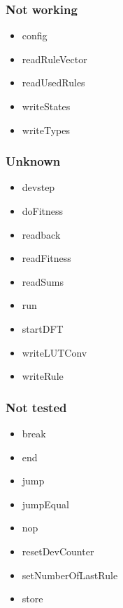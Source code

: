 \subsubsection{Not working}

\begin{itemize}
    \item config
    \item readRuleVector
    \item readUsedRules
    \item writeStates
    \item writeTypes
\end{itemize}

\subsubsection{Unknown}

\begin{itemize}
    \item devstep
    \item doFitness
    \item readback
    \item readFitness
    \item readSums
    \item run
    \item startDFT
    \item writeLUTConv
    \item writeRule
\end{itemize}

\subsubsection{Not tested}

\begin{itemize}
    \item break
    \item end
    \item jump
    \item jumpEqual
    \item nop
    \item resetDevCounter
    \item setNumberOfLastRule
    \item store
\end{itemize}

